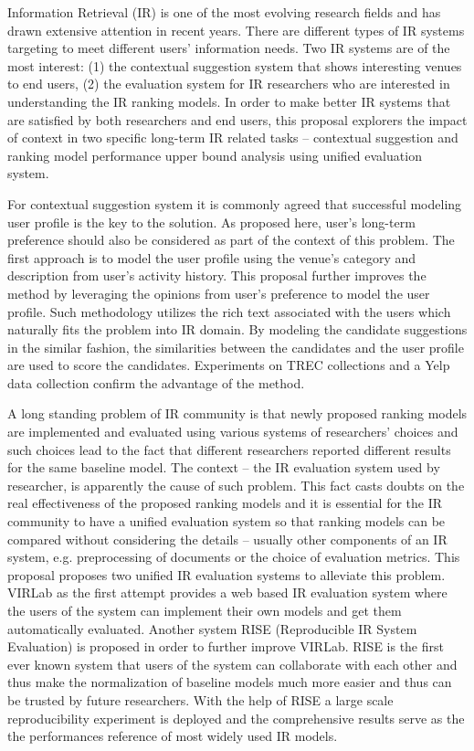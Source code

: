 %
%
Information Retrieval (IR) is one of the most evolving research fields 
and has drawn extensive attention in recent years. 
There are different types of IR systems targeting to meet 
different users' information needs. Two IR systems are of the most interest: (1) the contextual suggestion system that shows interesting venues to end users, (2) the evaluation system for IR researchers who are 
interested in understanding the IR ranking models.
In order to make better IR systems that are satisfied by both researchers 
and end users, this proposal explorers the impact of 
context in two specific long-term IR related tasks -- contextual suggestion 
and ranking model performance upper bound analysis using unified evaluation 
system.

For contextual suggestion system it is commonly agreed that successful 
modeling user profile is the key to the solution. As proposed here, user's 
long-term preference should also be considered as part of the context of 
this problem. 
The first approach is to model the user profile using the venue's category 
and description from user's activity history. This proposal further 
improves the 
method by leveraging the opinions from user's preference to model the 
user profile. Such methodology utilizes the rich text associated 
with the users which naturally fits the problem into IR domain. 
By modeling the candidate suggestions in the similar fashion, 
the similarities between the candidates and the user profile are used to 
score the candidates. Experiments on TREC collections and a Yelp data 
collection confirm the advantage of the method.

A long standing problem of IR community is that newly proposed ranking models 
are implemented and evaluated using various systems of researchers' choices 
and such choices lead to the fact that different researchers reported 
different results for the same baseline model. 
The context -- the IR evaluation system used by researcher, 
is apparently the cause of such problem. This fact casts doubts on the real 
effectiveness of the proposed ranking models and it is essential for the IR 
community to have a unified evaluation system so that ranking models can be 
compared without considering the details -- usually other components of an 
IR system, e.g. preprocessing of documents or the choice of evaluation 
metrics. 
This proposal proposes two unified IR evaluation systems to alleviate this problem. 
VIRLab as the first attempt provides a web based IR evaluation system 
where the users of the system can implement their own models and get them 
automatically evaluated.
Another system RISE (Reproducible IR System Evaluation) is proposed in order 
to further improve VIRLab.
RISE is the first ever known system that users of the system can collaborate 
with each other and thus make the normalization of baseline models much more 
easier and thus can be trusted by future researchers. 
With the help of RISE a large scale reproducibility experiment is deployed 
and the comprehensive results serve as the the performances reference of 
most widely used IR models.

